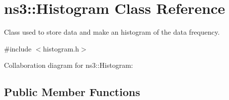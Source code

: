 \hypertarget{classns3_1_1Histogram}{}\section{ns3\+:\+:Histogram Class Reference}
\label{classns3_1_1Histogram}


Class used to store data and make an histogram of the data frequency.  




{\ttfamily \#include $<$histogram.\+h$>$}



Collaboration diagram for ns3\+:\+:Histogram\+:
\subsection*{Public Member Functions}
